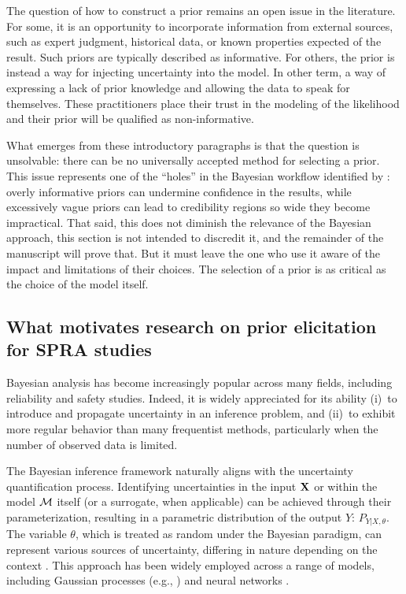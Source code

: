 The question of how to construct a prior remains an open issue in the literature. For some, it is an opportunity to incorporate information from external sources, such as expert judgment, historical data, or known properties expected of the result. Such priors are typically described as informative. For others, the prior is instead a way for injecting uncertainty into the model. In other term, a way of expressing a lack of prior knowledge and allowing the data to speak for themselves. These practitioners place their trust in the modeling of the likelihood and their prior will be qualified as non-informative.

What emerges from these introductory paragraphs is that the question is unsolvable: there can be no universally accepted method for selecting a prior. This issue represents one of the ``holes'' in the Bayesian workflow identified by \citet{gelman_holes_2020}: overly informative priors can undermine confidence in the results, while excessively vague priors can lead to credibility regions so wide they become impractical. That said, this does not diminish the relevance of the Bayesian approach, this section is not intended to discredit it, and the remainder of the manuscript will prove that. But it must leave the one who use it aware of the impact and limitations of their choices. The selection of a prior is as critical as the choice of the model itself.











\subsection{What motivates research on prior elicitation for SPRA studies}

Bayesian analysis has become increasingly popular across many fields, including reliability and safety studies. Indeed, it is widely appreciated for its ability (i)~to introduce and propagate uncertainty in an inference problem, and (ii)~to exhibit more regular behavior than many frequentist methods, particularly when the number of observed data is limited.

The Bayesian inference framework naturally aligns with the  uncertainty quantification process. Identifying uncertainties in the input $\mathbf{X}$ or within the model $\mathcal{M}$ itself (or a surrogate, when applicable) can be achieved through their parameterization, resulting in a parametric distribution of the output $Y$: $P_{Y|X,\theta}$. The variable $\theta$, which is treated as random under the Bayesian paradigm, can represent various sources of uncertainty, differing in nature depending on the context \citep{bousquet_contributions_2024}. This approach has been widely employed across a range of models, including Gaussian processes (e.g., \cite{gu_parallel_2016}) and neural networks \citep{arbel_bayes_2023}.

